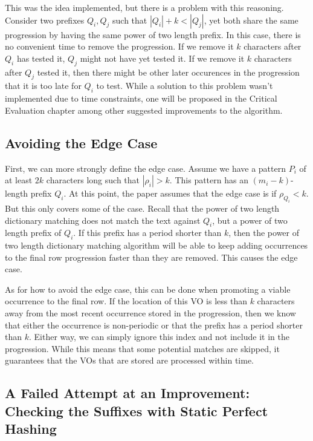 \documentclass[ %
                    author={Dominic Joseph Moylett},
                    degree={MEng},
                     title={Dictionary Matching with Fingerprints},
                  subtitle={An Empirical Analysis},
                      type={Research},
                      year={2014} ]{dissertation}
\begin{document}
This was the idea implemented, but there is a problem with this reasoning. Consider two prefixes $Q_i, Q_j$ such that $|Q_i| + k < |Q_j|$, yet both share the same progression by having the same power of two length prefix. In this case, there is no convenient time to remove the progression. If we remove it $k$ characters after $Q_i$ has tested it, $Q_j$ might not have yet tested it. If we remove it $k$ characters after $Q_j$ tested it, then there might be other later occurences in the progression that it is too late for $Q_i$ to test. While a solution to this problem wasn't implemented due to time constraints, one will be proposed in the Critical Evaluation chapter among other suggested improvements to the algorithm.

\subsection{Avoiding the Edge Case}

First, we can more strongly define the edge case. Assume we have a pattern $P_i$ of at least $2k$ characters long such that $|\rho_i| > k$. This pattern has an $(m_i - k)$-length prefix $Q_i$. At this point, the paper assumes that the edge case is if $\rho_{Q_i} < k$. But this only covers some of the case. Recall that the power of two length dictionary matching does not match the text against $Q_i$, but a power of two length prefix of $Q_i$. If this prefix has a period shorter than $k$, then the power of two length dictionary matching algorithm will be able to keep adding occurrences to the final row progression faster than they are removed. This causes the edge case.

As for how to avoid the edge case, this can be done when promoting a viable occurrence to the final row. If the location of this VO is less than $k$ characters away from the most recent occurrence stored in the progression, then we know that either the occurrence is non-periodic or that the prefix has a period shorter than $k$. Either way, we can simply ignore this index and not include it in the progression. While this means that some potential matches are skipped, it guarantees that the VOs that are stored are processed within time.

\subsection{A Failed Attempt at an Improvement: Checking the Suffixes with Static Perfect Hashing}
\label{ssec:static-hash-fail}
\end{document}
